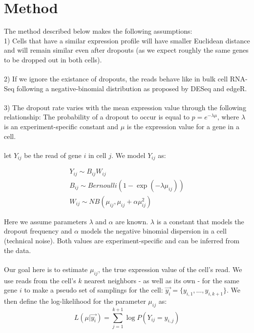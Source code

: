 \documentclass[11pt]{article}
\begin{document}
\section{Method}
The method described below makes the following assumptions:
\\
1) Cells that have a similar expression profile will have smaller Euclidean distance and will remain similar even after dropouts (as we expect roughly the same genes to be dropped out in both cells). \\
\\
2) If we ignore the existance of dropouts, the reads behave like in bulk cell RNA-Seq following a negative-binomial distribution as proposed by DESeq and edgeR. \cite{anders2010differential} \cite{kharchenko2014bayesian}\\
\\
3) The dropout rate varies with the mean expression value through the following relationship: The probability of a dropout to occur is equal to $p = e^{-\lambda \mu}$, where $\lambda$ is an experiment-specific constant and $\mu$ is the expression value for a gene in a cell. \cite{pierson2015zifa}\\
\\
let $Y_{ij}$ be the read of gene $i$ in cell $j$. We model $Y_{ij}$ as:

\begin{equation}
\begin{split}
Y_{ij} \sim B_{ij} W_{ij} \\
B_{ij} \sim Bernoulli (1 - \exp (-\lambda \mu_{ij})) \\
W_{ij} \sim NB(\mu_{ij}, \mu_{ij} + \alpha \mu_{ij}^{2})
\end{split}
\end{equation}

Here we assume parameters $\lambda$ and $\alpha$ are known. $\lambda$ is a constant that models the dropout frequency and $\alpha$ models the negative binomial dispersion in a cell (technical noise). Both values are experiment-specific and can be inferred from the data. \\
\\
Our goal here is to estimate $\mu_{ij}$, the true expression value of the cell's read. We use reads from the cell's $k$ nearest neighbors - as well as its own - for the same gene $i$ to make a pseudo set of samplings for the cell: $\vec{y_i} = \{y_{i,1}, \dots, y_{i,k+1} \}$. We then define the log-likelihood for the parameter $\mu_{ij}$ as:
$$
L(\mu | \vec{y_i}) = \sum_{j=1}^{k+1} \log P(Y_{ij} = y_{i,j}) 
$$
\end{document}
